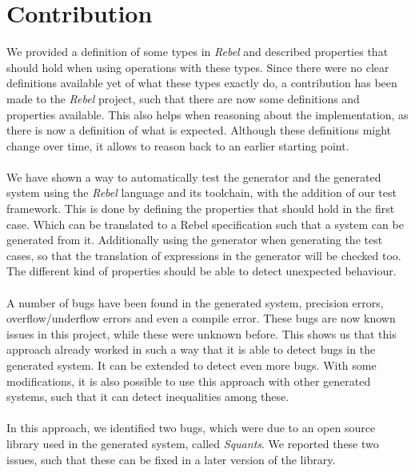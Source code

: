 \section{Contribution}
We provided a definition of some types in \textit{Rebel} and described properties that should hold when using operations with these types. Since there were no clear definitions available yet of what these types exactly do, a contribution has been made to the \textit{Rebel} project, such that there are now some definitions and properties available. This also helps when reasoning about the implementation, as there is now a definition of what is expected. Although these definitions might change over time, it allows to reason back to an earlier starting point.\\
\\
We have shown a way to automatically test the generator and the generated system using the \textit{Rebel} language and its toolchain, with the addition of our test framework. This is done by defining the properties that should hold in the first case. Which can be translated to a Rebel specification such that a system can be generated from it. Additionally using the generator when generating the test cases, so that the translation of expressions in the generator will be checked too. The different kind of properties should be able to detect unexpected behaviour.\\
\\
A number of bugs have been found in the generated system, precision errors, overflow/underflow errors and even a compile error. These bugs are now known issues in this project, while these were unknown before. This shows us that this approach already worked in such a way that it is able to detect bugs in the generated system. It can be extended to detect even more bugs. With some modifications, it is also possible to use this approach with other generated systems, such that it can detect inequalities among these.\\
\\
In this approach, we identified two bugs, which were due to an open source library used in the generated
system, called \textit{Squants}. We reported these two issues, such that these can be fixed in a later version of the library.

